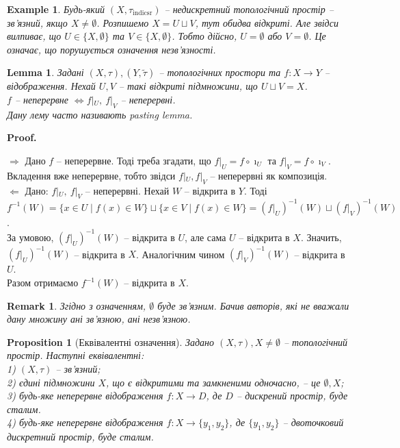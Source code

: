 \documentclass[a4paper, 10pt]{article}
\makeatletter
\def\rightproof{$\boxed{\Rightarrow}$ }
\def\leftproof{$\boxed{\Leftarrow}$ }
\theoremstyle{theoremdd}
\newtheorem{example}[theorem]{Example}
\newtheorem{proposition}[theorem]{Proposition}
\newtheorem{remark}[theorem]{Remark}
\newtheorem{lemma}[theorem]{Lemma}
\renewenvironment{proof}[1][Proof.\\]{\par
\pushQED{\hfill \qed}%
\normalfont \topsep6\p@\@plus6\p@\relax
\trivlist
\item\relax
{\bfseries
#1\@addpunct{.}}\hspace\labelsep\ignorespaces
}{%
\popQED\endtrivlist\@endpefalse
}
\makeatother
\begin{document}
\begin{example}
Будь-який $(X,\tau_{\text{indicsr}})$ -- недискретний топологічний простір -- зв'язний, якщо $X \neq \emptyset$. Розпишемо $X = U \sqcup V$, тут обидва відкриті. Але звідси вилпиває, що $U \in \{X, \emptyset\}$ та $V \in \{X,\emptyset\}$. Тобто дійсно, $U = \emptyset$ або $V = \emptyset$. Це означає, що порушується означення незв'язності.
\end{example}

\begin{lemma}
Задані $(X,\tau), (Y,\tilde{\tau})$ -- топологічних простори та $f \colon X \to Y$ -- відображення. Нехай $U,V$ -- такі відкриті підмножини, що $U \sqcup V = X$.\\
$f$ -- неперервне $\iff f|_U,\ f|_V$ -- неперервні.\\
\textit{Дану лему часто називають pasting lemma}.
\end{lemma}

\begin{proof}
\rightproof Дано $f$ -- неперервне. Тоді треба згадати, що $f|_U = f \circ \imath_U$ та $f|_V = f \circ \imath_V$. Вкладення вже неперервне, тобто звідси $f|_U, f|_V$ -- неперервні як композиція.
\bigskip \\
\leftproof Дано: $f|_U,\ f|_V$ -- неперервні. Нехай $W$ -- відкрита в $Y$. Тоді\\
$f^{-1}(W) = \{x \in U \mid f(x) \in W\} \sqcup \{x \in V \mid f(x) \in W\} = (f|_U)^{-1}(W) \sqcup (f|_V)^{-1}(W)$.\\
За умовою, $(f|_U)^{-1}(W)$ -- відкрита в $U$, але сама $U$ -- відкрита в $X$. Значить, $(f|_U)^{-1}(W)$ -- відкрита в $X$. Аналогічним чином $(f|_V)^{-1}(W)$ -- відкрита в $U$.\\
Разом отримаємо $f^{-1}(W)$ -- відкрита в $X$.
\end{proof}

\iffalse
\begin{remark}
Згідно з означенням, $\emptyset$ не є ані зв'язним, ані незв'язним. Хоча деякі вважають $\emptyset$ за зв'язним.
\end{remark}
\fi

\begin{remark}
Згідно з означенням, $\emptyset$ буде зв'язним. Бачив авторів, які не вважали дану множину ані зв'язною, ані незв'язною.
\end{remark}

\begin{proposition}[Еквівалентні означення]
Задано $(X,\tau), X \neq \emptyset$ -- топологічний простір. Наступні еквівалентні:\\
1) $(X,\tau)$ -- зв'язний;\\
2) єдині підмножини $X$, що є відкритими та замкненими одночасно, -- це $\emptyset, X$;\\
3) будь-яке неперервне відображення $f \colon X \to D$, де $D$ -- дискрений простір, буде сталим.\\
4) будь-яке неперервне відображення $f \colon X \to \{y_1,y_2\}$, де $\{y_1,y_2\}$ -- двоточковий дискретний простір, буде сталим.
\end{proposition}
\end{document}
